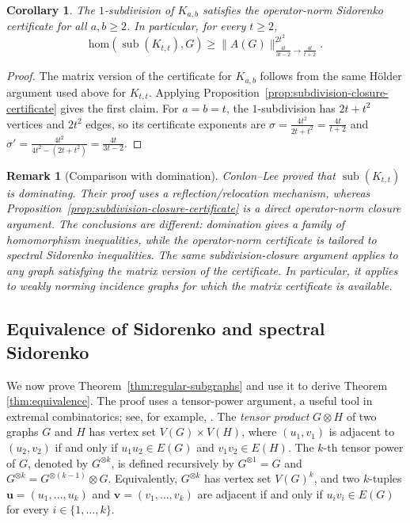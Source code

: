 \documentclass[10pt,a4paper]{amsart}
\newtheorem{corollary}[theorem]{Corollary}
\newtheorem{remark}{Remark}
\newcommand{\homc}{\mathrm{hom}}
\begin{document}
\begin{corollary}
The \(1\)-subdivision of \(K_{a,b}\) satisfies the operator-norm
Sidorenko certificate for all \(a,b\ge2\).  In particular, for every \(t\ge2\),
\[
        \homc(\operatorname{sub}(K_{t,t}),G)
        \ge
        \|A(G)\|_{\frac{4t}{3t-2}\to \frac{4t}{t+2}}^{2t^2}.
\]
\end{corollary}

\begin{proof}
The matrix version of the certificate for \(K_{a,b}\) follows from the
same H\"older argument used above for \(K_{t,t}\).  Applying
Proposition~\ref{prop:subdivision-closure-certificate} gives the first
claim.  For \(a=b=t\), the \(1\)-subdivision has \(2t+t^2\) vertices and
\(2t^2\) edges, so its certificate exponents are
$\sigma=\frac{4t^2}{2t+t^2}=\frac{4t}{t+2}$ and $       \sigma'=\frac{4t^2}{4t^2-(2t+t^2)}
        =
        \frac{4t}{3t-2}.$
\end{proof}

\begin{remark}[Comparison with domination]
Conlon--Lee proved that \(\operatorname{sub}(K_{t,t})\) is dominating.
Their proof uses a reflection/relocation mechanism, whereas
Proposition~\ref{prop:subdivision-closure-certificate} is a direct
operator-norm closure argument.  The conclusions are different:
domination gives a family of homomorphism inequalities, while the
operator-norm certificate is tailored to spectral Sidorenko inequalities.
The same subdivision-closure argument applies to any graph satisfying the
matrix version of the certificate.  In particular, it applies to weakly norming incidence graphs for which the matrix certificate is available. 
\end{remark}


\subsection{Equivalence of Sidorenko and spectral Sidorenko}

We now prove Theorem~\ref{thm:regular-subgraphs} and use it to derive Theorem \ref{thm:equivalence}.  The proof uses a tensor-power
argument, a useful tool in extremal combinatorics; see, for example,
\cite{ConlonFoxSudakov2010, FoxLovasz2017Adv, LovaszSauermann2019PLMS,Tao2008TensorPower}. The \emph{tensor product} \(G\otimes H\) of two graphs \(G\) and \(H\)
has vertex set \(V(G)\times V(H)\), where \((u_1,v_1)\) is adjacent to
\((u_2,v_2)\) if and only if \(u_1u_2\in E(G)\) and \(v_1v_2\in E(H)\).
The \(k\)-th tensor power of \(G\), denoted by \(G^{\otimes k}\), is
defined recursively by \(G^{\otimes 1}=G\) and
\(G^{\otimes k}=G^{\otimes(k-1)}\otimes G\).  Equivalently,
\(G^{\otimes k}\) has vertex set \(V(G)^k\), and two \(k\)-tuples
\(\bm u=(u_1,\dots,u_k)\) and \(\bm v=(v_1,\dots,v_k)\) are adjacent if
and only if \(u_i v_i\in E(G)\) for every \(i\in\{1,\dots,k\}\).
\end{document}

